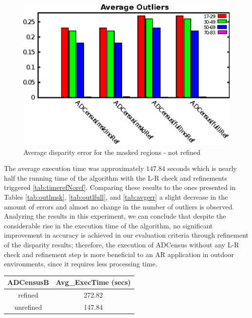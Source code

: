 \begin{figure}[H]
\centering
\includegraphics[scale=0.95]{adcrefNoref}
\caption{Average disparity error for the masked regions - not refined}
\label{fig:outlnoref}
\end{figure} 

The average execution time was approximately $147.84$ seconds which is nearly half the running time of the algorithm with the L-R check and refinements triggered \ref{tab:timerefNoref}. 
Comparing these results to the ones presented in Tables \ref{tab:outlmsk}, \ref{tab:outlfull}, and \ref{tab:avgerr} a slight decrease in the amount of errors and 
almost no change in the number of outliers is observed.
Analyzing the results in this experiment, we can conclude that despite the considerable rise in the execution time of the algorithm, no significant
improvement in accuracy is achieved in our evaluation criteria through refinement of the disparity results; therefore, the execution of ADCensus without any L-R check and
refinement step is more beneficial to an AR application in outdoor environments, since it requires less processing time.\newline

\begin{minipage}{\linewidth}
\begin{center}
\label{tab:timerefNoref}
\begin{tabular}{|c|c|}
\hline
ADCensusB & Avg\_ExecTime (secs) \\ \hline
refined & 272.82 \\  \hline
unrefined & 147.84 \\ \hline
\end{tabular}
\end{center}
\end{minipage} \newline

